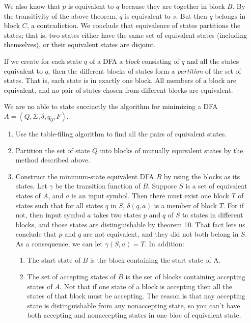 \documentclass[]{article}
\begin{document}
    We also know that $p$ is equivalent to $q$ because they are together in
    block $B$. By the transitivity of the above theorem, $q$ is equivalent to $s
    $. But then $q$ belongs in block $C$, a contradiction. We conclude that
    equivalence of states partitions the states; that is, two states either have
    the same set of equivalent states (including themselves), or their
    equivalent states are disjoint.
      \begin{thm}
        If we create for each state $q$ of a DFA a \emph{block} consisting of $q
        $ and all the states equivalent to $q$, then the different blocks of
        states form a \emph{partition} of the set of states. That is, each state
        is in exactly one block. All members of a block are equivalent, and no
        pair of states chosen from different blocks are equivalent.
      \end{thm}
    We are no able to state succinctly the algorithm for minimizing a DFA $A =
    (Q, \Sigma, \delta, q_0, F)$.
      \begin{enumerate}
        \item Use the table-filing algorithm to find all the pairs of equivalent
        states.
        \item Partition the set of state $Q$ into blocks of mutually equivalent
        states by the method described above.
        \item Construct the minimum-state equivalent DFA $B$ by using the blocks
        as its states. Let $\gamma$ be the transition function of $B$. Suppose
        $S$ is a set of equivalent states of $A$, and $a$ is an input symbol.
        Then there must exist one block $T$ of states such that for all states
        $q$ in $S$, $\delta(q,a)$ is a member of block $T$. For if not, then
        input symbol $a$ takes two states $p$ and $q$ of $S$ to states in
        different blocks, and those states are distinguishable by theorem 10.
        That fact lets us conclude that $p$ and $q$ are not equivalent, and they
        did not both belong in $S$. As a consequence, we can let $\gamma(S, a) =
        T$. In addition:
          \begin{enumerate}
            \item The start state of $B$ is the block containing the start state
            of A.
            \item The set of accepting states of $B$ is the set of blocks
            containing accepting states of $A$. Not that if one state of a block
            is accepting then all the states of that block must be accepting.
            The reason is that nay accepting state is distinguishable from any
            nonaccepting state, so you can't have both accepting and
            nonaccepting states in one bloc of equivalent state.
          \end{enumerate}
      \end{enumerate}
\end{document}

